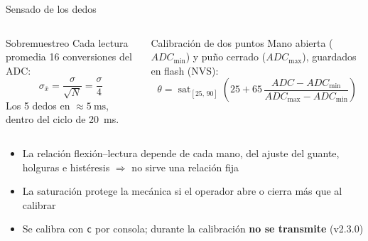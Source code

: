 \documentclass[aspectratio=169,10pt]{beamer}
\begin{document}
\begin{frame}{Sensado de los dedos}
  \begin{columns}[T]
    \begin{block}{Sobremuestreo}
      Cada lectura promedia 16 conversiones del ADC:
      \[ \sigma_{\bar{x}} = \frac{\sigma}{\sqrt{N}} = \frac{\sigma}{4} \]
      Los 5 dedos en $\approx\SI{5}{\milli\second}$, dentro del ciclo de \SI{20}{\milli\second}.
    \end{block}
    \begin{block}{Calibración de dos puntos}
      Mano abierta ($ADC_{\min}$) y puño cerrado ($ADC_{\max}$), guardados en flash (NVS):
      \[ \theta = \operatorname{sat}_{[25,\,90]}\!\left( 25 + 65\,\frac{ADC - ADC_{\min}}{ADC_{\max} - ADC_{\min}} \right) \]
    \end{block}
  \end{columns}
  \vspace{1ex}
  \begin{itemize}
    \item La relación flexión--lectura depende de cada mano, del ajuste del guante, holguras e histéresis $\Rightarrow$ no sirve una relación fija
    \item La saturación protege la mecánica si el operador abre o cierra más que al calibrar
    \item Se calibra con \texttt{c} por consola; durante la calibración \textbf{no se transmite} (v2.3.0)
  \end{itemize}
\end{frame}
\end{document}
